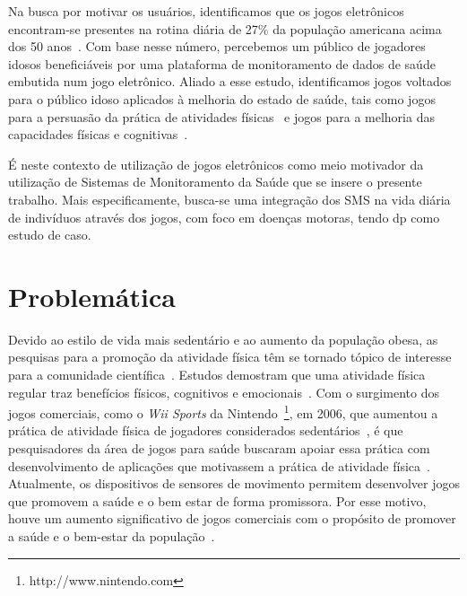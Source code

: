 Na busca por motivar os usuários, identificamos que os jogos eletrônicos encontram-se presentes na rotina diária de 27\% da população americana acima dos 50 anos~\cite{esa2015}. Com base nesse número, percebemos um público de jogadores idosos beneficiáveis por uma plataforma de monitoramento de dados de saúde embutida num jogo eletrônico. Aliado a esse estudo, identificamos jogos voltados para o público idoso aplicados à melhoria do estado de saúde, tais como jogos para a persuasão da prática de atividades físicas~\cite{brox11} e jogos para a melhoria das capacidades físicas e cognitivas~\cite{arntzen2011}. 

É neste contexto de utilização de jogos eletrônicos como meio motivador da utilização de Sistemas de Monitoramento da Saúde que se insere o presente trabalho. Mais especificamente, busca-se uma integração dos SMS na vida diária de indivíduos através dos jogos, com foco em doenças motoras, tendo \ac{dp} como estudo de caso.

\section{Problemática}\label{section:problematica}


Devido ao estilo de vida mais sedentário e ao aumento da população obesa, as pesquisas para a promoção da atividade física têm se tornado tópico de interesse para a comunidade científica~\cite{maitland2009,bartolome11,Mandryk2014}. Estudos demostram que uma atividade física regular traz benefícios físicos, cognitivos e emocionais~\cite{Mandryk2014}. Com o surgimento dos jogos comerciais, como o \textit{Wii Sports} da Nintendo~\footnote{http://www.nintendo.com}, em 2006, que aumentou a prática de atividade física de jogadores considerados sedentários~\cite{wiigraves2008}, é que pesquisadores da área de jogos para saúde buscaram apoiar essa prática com desenvolvimento de aplicações que motivassem a prática de atividade física~\cite{stacey2011}. Atualmente, os dispositivos de sensores de movimento permitem desenvolver jogos que promovem a saúde e o bem estar de forma promissora. Por esse motivo, houve um aumento significativo de jogos comerciais com o propósito de promover a saúde e o bem-estar da população~\cite{Papastergiou:2009:EPC:1570538.1570707}.



